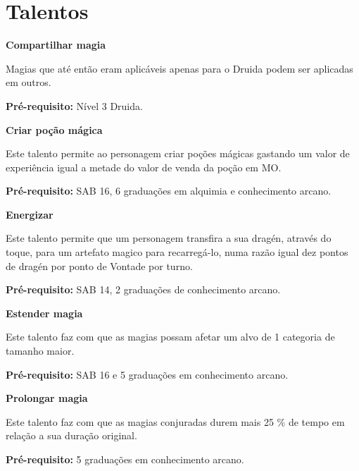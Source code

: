 \section{Talentos}
\label{sec:talentos}

\textbf{Compartilhar magia}

Magias que até então eram aplicáveis apenas para o Druida podem ser aplicadas em outros.

\textbf{Pré-requisito:} Nível 3 Druida.

\bigskip


\textbf{Criar poção mágica}

Este talento permite ao personagem criar poções mágicas gastando um valor de experiência igual a metade do valor de venda da poção em MO.

\textbf{Pré-requisito:} SAB 16, 6 graduações em alquimia e conhecimento arcano.

\bigskip

\textbf{Energizar}

Este talento permite que um personagem transfira a sua dragén, através do toque, para um artefato magico para recarregá-lo, numa razão igual dez pontos de dragén por ponto de Vontade por turno.

\textbf{Pré-requisito:} SAB 14, 2 graduações de conhecimento arcano.
\bigskip

\textbf{Estender magia}

Este talento faz com que as magias possam afetar um alvo de 1 categoria de tamanho maior.

\textbf{Pré-requisito:} SAB 16 e 5 graduações em conhecimento arcano.
\bigskip

\textbf{Prolongar magia}

Este talento faz com que as magias conjuradas durem mais 25 \% de tempo em relação a sua duração original.

\textbf{Pré-requisito:} 5 graduações em conhecimento arcano.
\bigskip

